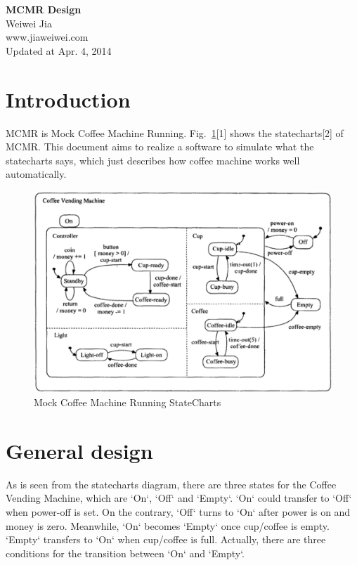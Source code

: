 \documentclass[a4paper]{article}
\begin{document}
\begin{centering}

\Large \Large \textbf{MCMR Design}\\
\small Weiwei Jia\\
\small www.jiaweiwei.com\\
\small Updated at Apr. 4, 2014\\

\end{centering}

\begin{flushleft}
\end{flushleft}

\section{Introduction}
MCMR is Mock Coffee Machine Running. Fig.~\ref{fig:mcmr-cm}[1]
shows the statecharts[2] of MCMR. This document aims to realize
a software to simulate what the statecharts says, which just
describes how coffee machine works well automatically.

\begin{figure}[htbp]
\begin{center}
  \includegraphics[width=5.8in]{figure/coffee_machine.eps}
  \caption{Mock Coffee Machine Running StateCharts}
  \label{fig:mcmr-cm}
\end{center}
\end{figure}

\section{General design}
As is seen from the statecharts diagram, there are three states
for the Coffee Vending Machine, which are `On`, `Off` and `Empty`.
`On` could transfer to `Off` when power-off is set. On the contrary,
`Off` turns to `On` after power is on and money is zero. Meanwhile,
`On` becomes `Empty` once cup/coffee is empty. `Empty` transfers to
`On` when cup/coffee is full. Actually, there are three conditions
for the transition between `On` and `Empty`.
\end{document}
